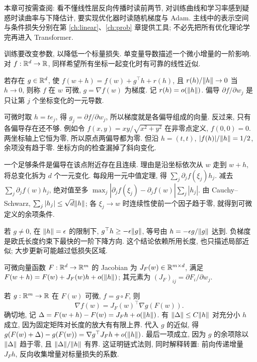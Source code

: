 \label{ch:opt}
本章可按需查阅: 看不懂线性层反向传播时读前两节, 对训练曲线和学习率感到疑惑时读曲率与下降估计, 要实现优化器时读随机梯度与 Adam. 主线中的表示空间与条件损失分别在第 \ref{ch:linear}、\ref{ch:prob} 章提供工具; 不必先把所有优化理论学完再进入 Transformer.

训练要改变参数, 以降低一个标量损失. 单变量导数描述一个微小增量的一阶影响. 对 $f:\mathbb R^d\to\mathbb R$, 同样希望所有坐标一起变化时有可靠的线性近似.
\begin{definition}
若存在 $g\in\mathbb R^d$, 使 $f(w+h)=f(w)+g^\top h+r(h)$, 且 $r(h)/\lVert h\rVert\to0$ 当 $h\to0$, 则称 $f$ 在 $w$ 可微, $g=\nabla f(w)$ 为梯度. 记 $r(h)=o(\lVert h\rVert)$. 偏导 $\partial f/\partial w_j$ 是只让第 $j$ 个坐标变化的一元导数.
\end{definition}
可微时取 $h=te_j$, 得 $g_j=\partial f/\partial w_j$, 所以梯度就是各偏导组成的向量. 反过来, 只有各偏导存在还不够. 例如令 $f(x,y)=xy/\sqrt{x^2+y^2}$ 在非零点定义, $f(0,0)=0$. 两坐标轴上它恒为零, 所以原点两偏导都为零. 但沿 $h=(t,t)$, $|f(h)|/\lVert h\rVert=1/2$, 余项没有趋于零. 坐标方向的检查漏掉了斜向变化.

一个足够条件是偏导在该点附近存在且连续. 理由是沿坐标依次从 $w$ 走到 $w+h$, 将总变化拆为 $d$ 个一元变化. 每段用一元中值定理, 得 $\sum_j\partial_j f(\xi_j)h_j$. 减去 $\sum_j\partial_j f(w)h_j$, 绝对值至多
$\max_j|\partial_jf(\xi_j)-\partial_jf(w)|\sum_j|h_j|$.
由 Cauchy--Schwarz, $\sum_j|h_j|\le\sqrt d\lVert h\rVert$; 各 $\xi_j\to w$ 时连续性使前一个因子趋于零, 就得到可微定义的余项条件.

若 $g\ne0$, 在 $\lVert h\rVert=\epsilon$ 的限制下, $g^\top h\ge-\epsilon\lVert g\rVert$, 等号由 $h=-\epsilon g/\lVert g\rVert$ 达到. 负梯度是欧氏长度约束下最快的一阶下降方向. 这个结论依赖所用长度, 也只描述局部近似; 大步更新可能越过低损失区域.

\begin{definition}
可微向量函数 $F:\mathbb R^d\to\mathbb R^m$ 的 Jacobian 为 $J_F(w)\in\mathbb R^{m\times d}$, 满足
$F(w+h)=F(w)+J_F(w)h+o(\lVert h\rVert)$;
其元素为 $(J_F)_{ij}=\partial F_i/\partial w_j$.
\end{definition}
若 $g:\mathbb R^m\to\mathbb R$ 在 $F(w)$ 可微, $f=g\circ F$, 则
\[
\nabla f(w)=J_F(w)^\top\nabla g(F(w)).
\]
确切地, 记 $\Delta=F(w+h)-F(w)=J_Fh+o(\lVert h\rVert)$. 有 $\lVert \Delta\rVert\le C\lVert h\rVert$ 对充分小 $h$ 成立, 因为固定矩阵对长度的放大有有限上界. 代入 $g$ 的近似, 得 $g(F(w)+\Delta)-g(F(w))=\nabla g^\top J_Fh+o(\lVert h\rVert)$. 最后一项成立, 因为 $g$ 的余项除以 $\lVert \Delta\rVert$ 趋于零, 且 $\lVert \Delta\rVert/\lVert h\rVert$ 有界. 这证明链式法则, 同时解释转置: 前向传递增量 $J_Fh$, 反向收集增量对标量损失的系数.


